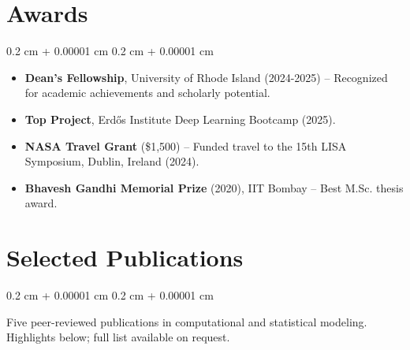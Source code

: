 \documentclass[10pt, letterpaper]{article}
\newenvironment{highlightsforbulletentries}{
    \begin{itemize}[
        topsep=0.10 cm,
        parsep=0.10 cm,
        partopsep=0pt,
        itemsep=0pt,
        leftmargin=10pt
    ]
}{
    \end{itemize}
}
\newenvironment{onecolentry}{
    \begin{adjustwidth}{
        0.2 cm + 0.00001 cm
    }{
        0.2 cm + 0.00001 cm
    }
}{
    \end{adjustwidth}
}
\begin{document}
 
\section{Awards}
\begin{onecolentry}
  \begin{highlightsforbulletentries}
    \item \textbf{Dean's Fellowship}, University of Rhode Island (2024-2025) -- Recognized for academic achievements and scholarly potential.
    \item \textbf{Top Project}, Erd\H{o}s Institute Deep Learning Bootcamp (2025).
    \item \textbf{NASA Travel Grant} (\$1,500) -- Funded travel to the 15th LISA Symposium, Dublin, Ireland (2024).
    \item \textbf{Bhavesh Gandhi Memorial Prize} (2020), IIT Bombay -- Best M.Sc. thesis award.
  \end{highlightsforbulletentries}
\end{onecolentry}
 
 
\section{Selected Publications}
 
\begin{onecolentry}
  Five peer-reviewed publications in computational and statistical modeling. Highlights below; full list available on request.
\end{onecolentry}
 
\vspace{0.2 cm}
 
\end{document}
